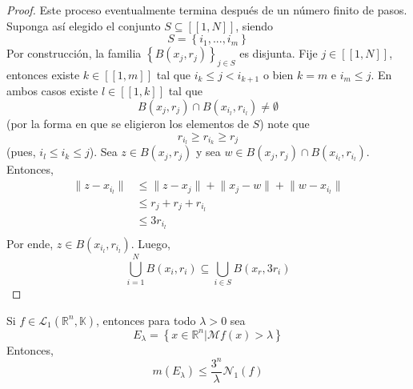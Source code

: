 \documentclass[12pt]{report}
\newcounter{it}
\theoremstyle{largebreak}
\renewcommand{\leq}{\ensuremath{\leqslant}}
\renewcommand{\geq}{\ensuremath{\geqslant}}
\newcommand\norm[1]{\ensuremath{\|#1\|}}
\newcommand{\N}[2]{\ensuremath{\mathcal{N}_{#1}\left(#2\right)}}
\newcommand{\natint}[1]{\ensuremath{\left[\!\left[#1\right]\!\right]}}
\begin{document}
\begin{proof}
        Este proceso eventualmente termina después de un número finito de pasos. Suponga así elegido el conjunto $S\subseteq\natint{1,N}$, siendo
        \begin{equation*}
            S=\left\{i_1,...,i_m\right\}
        \end{equation*}
        Por construcción, la familia $\left\{B(x_j,r_j) \right\}_{ j\in S}$ es disjunta. Fije $j\in\natint{1,N}$, entonces existe $k\in\natint{1,m}$ tal que $i_k\leq j<i_{ k+1}$ o bien $k=m$ e $i_m\leq j$. En ambos casos existe $l\in\natint{1,k}$ tal que
        \begin{equation*}
            B(x_j,r_j)\cap B(x_{ i_l},r_{ i_l})\neq\emptyset
        \end{equation*}
        (por la forma en que se eligieron los elementos de $S$) note que
        \begin{equation*}
            r_{ i_l}\geq r_{ i_k}\geq r_j 
        \end{equation*}
        (pues, $i_l\leq i_k\leq j$). Sea $z\in B(x_j,r_j)$ y sea $w\in B(x_j,r_j)\cap B(x_{ i_l},r_{ i_l})$. Entonces,
        \begin{equation*}
            \begin{split}
                \norm{z-x_{ i_l}}&\leq\norm{z-x_j}+\norm{x_j-w}+\norm{w-x_{ i_l}}\\
                &\leq r_j+r_j+r_{ i_l}\\
                &\leq 3r_{ i_l}\\
            \end{split}
        \end{equation*}
        Por ende, $z\in B(x_{ i_l},r_{ i_l})$. Luego,
        \begin{equation*}
            \bigcup_{ i=1}^N B(x_i,r_i)\subseteq\bigcup_{ i\in S}B(x_r,3r_i)
        \end{equation*}
    \end{proof}

    \begin{propo}
        Si $f\in\mathcal{L}_1(\mathbb{R}^n,\mathbb{K})$, entonces para todo $\lambda>0$ sea
        \begin{equation*}
            E_\lambda=\left\{x\in\mathbb{R}^n\Big|\mathcal{M}f(x)>\lambda \right\}
        \end{equation*}
        Entonces,
        \begin{equation*}
            m(E_\lambda)\leq\frac{3^n}{\lambda}\N{1}{f}
        \end{equation*}
    \end{propo}
\end{document}
